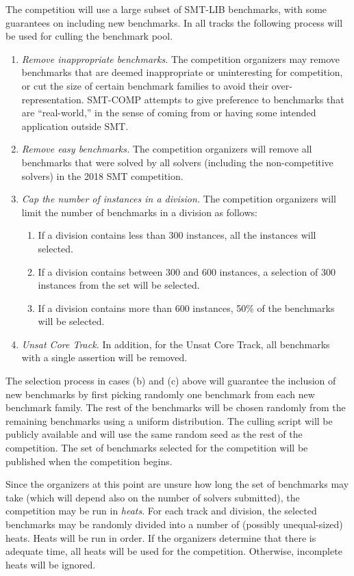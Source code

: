 \documentclass[12pt]{article}
\newcommand{\ucoretrack}{Unsat Core Track\xspace}
\begin{document}
 \label{benchmark-selection}
%
The competition will use a large subset of SMT-LIB benchmarks, with some
guarantees on including new benchmarks.  In all tracks the following
process will be used for culling the benchmark pool.
\begin{enumerate}
\item \emph{Remove inappropriate benchmarks.} The competition
  organizers may remove benchmarks that are deemed inappropriate or
  uninteresting for competition, or cut the size of certain benchmark
  families to avoid their over-representation.  SMT-COMP attempts to
  give preference to benchmarks that are ``real-world,'' in the sense
  of coming from or having some intended application outside SMT.
\item \emph{Remove easy benchmarks.} The competition organizers will
  remove all benchmarks that were solved by all solvers (including the
  non-competitive solvers) in the 2018 SMT competition.
\item \emph{Cap the number of instances in a division.} The competition
  organizers will limit the number of benchmarks in a division as
  follows:
  \begin{enumerate}
  \item If a division contains less than 300 instances, all
        the instances will selected.
  \item If a division contains between 300 and 600 instances,
        a selection of 300 instances from the set will be selected.
  \item If a division contains more than 600 instances, 50\% of
        the benchmarks will be selected.
  \end{enumerate}
\item \emph{\ucoretrack{}.} In addition, for the \ucoretrack{}, all
  benchmarks with a single assertion will be removed.
\end{enumerate}
%
The selection process in cases (b) and (c) above will guarantee the
inclusion of new benchmarks by first picking randomly one benchmark from
each new benchmark family.  The rest of the benchmarks will be chosen
randomly from the remaining benchmarks using a uniform distribution.
%
The culling script will be publicly available and will use the same
random seed as the rest of the competition.  The set of benchmarks
selected for the competition will be published when the competition
begins.

%
Since the organizers at this point are unsure how long the set of
benchmarks may take (which will depend also on the number of solvers
submitted), the competition may be run in \emph{heats}.  For each
track and division, the selected benchmarks may be randomly divided
into a number of (possibly unequal-sized) heats.  Heats will be run in
order.  If the organizers determine that there is adequate time, all
heats will be used for the competition.  Otherwise, incomplete heats
will be ignored.
\end{document}
